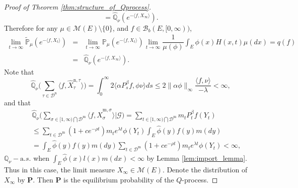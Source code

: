 \documentclass[12pt,a4paper]{amsart}
\numberwithin{equation}{section}
\theoremstyle{plain}
\theoremstyle{definition}
\begin{document}
\begin{proof}[Proof of Theorem \ref{thm:structure_of_Qprocess}]
\begin{equation*}
    =\widehat{\mathbb Q}_{\nu}\left(e^{-\langle f, X_{\infty}\rangle }\right).
  \end{equation*}
  Therefore for any $\mu\in\mathcal M(E)\setminus\{0\}$, and $f\in\mathcal B_b(E,[0,\infty))$,
  \begin{eqnarray*}
    \lim_{t\rightarrow\infty}\widetilde{\mathbb P}_\mu\left(e^{-\langle f, X_t\rangle}\right)&=&\lim_{t\rightarrow\infty}\mathbb P_\mu\left(e^{-\langle f, X_t\rangle}\right)
                                                                                                 \lim_{t\to\infty}\dfrac{1}{\mu(\phi)}\int_E\phi(x)H(x, t)\mu(dx)=q(f)\\
                                                                                             &=&\widehat{\mathbb Q}_{\nu}\left(e^{-\langle f, X_{\infty}\rangle }\right).
  \end{eqnarray*}
  Note that
  \[
    \widehat{\mathbb Q}_{\nu}\big(\sum_{\tau\in \mathcal D^{\mathrm n}}\langle f, \widehat X_{\tau}^{{\mathrm n},\tau} \rangle \big)=\int_0^\infty2\langle \alpha P^{\beta}_sf,\phi\nu\rangle ds
    \leq 2\|\alpha\phi\|_\infty\dfrac{\langle f,\nu\rangle }{-\lambda}<\infty,
  \]
  and that
  \begin{eqnarray*}
    &&\widehat{\mathbb Q}_{\nu}\Big(\sum_{\sigma\in [1,\infty)\bigcap\mathcal D^{\mathrm m}}\langle f, \widehat X_{\sigma}^{{\mathrm m},\sigma} \rangle|\mathcal G \Big)
       =\sum_{t\in [1,\infty)\bigcap\mathcal D^{\mathrm m}}m_tP^{\beta}_tf( Y_t)\\
    &&\leq \sum_{t\in \mathcal D^{\mathrm m}}(1+ce^{-\rho t})m_te^{\lambda t}
       \phi(Y_t)\int_E\widehat\phi(y)f(y)m(dy)\\
    &&=\int_E\widehat\phi(y)f(y)m(dy) \sum_{t\in \mathcal D^{\mathrm m}}(1+ce^{-\rho t})m_te^{\lambda t}\phi(Y_t)<\infty,
  \end{eqnarray*}
  $\mathbb Q_{\nu}-{\mathrm a.s.}$ when $\int_E\widehat\phi(x)l(x)m(dx)<\infty$ by Lemma \ref{lem:import_lemma}.
  Thus in this case, the limit measure $X_\infty\in \mathcal M(E)$.  Denote the distribution of $X_\infty$ by $\mathbf P$.  Then $\mathbf P$
  is the equilibrium probability of the $Q$-process.



\end{proof}
\end{document}
